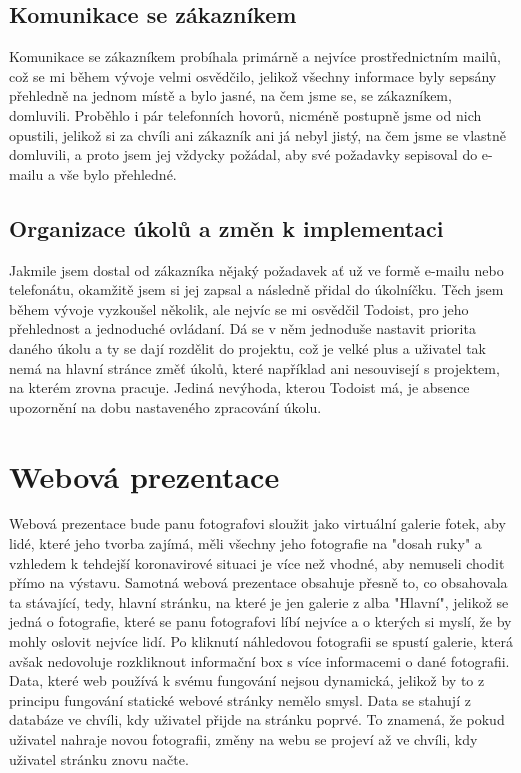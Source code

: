 \documentclass[12pt,a4paper]{report}
\begin{document}
  \section{Komunikace se zákazníkem}
  Komunikace se zákazníkem probíhala primárně a nejvíce prostřednictním mailů,
  což se mi během vývoje velmi osvědčilo, jelikož všechny informace byly sepsány přehledně
  na jednom místě a bylo jasné, na čem jsme se, se zákazníkem, domluvili. Proběhlo i pár telefonních hovorů,
  nicméně postupně jsme od nich opustili, jelikož si za chvíli ani zákazník ani já nebyl jistý, na čem jsme se vlastně domluvili, a proto jsem jej vždycky
  požádal, aby své požadavky sepisoval do e-mailu a vše bylo přehledné.
 
  \section{Organizace úkolů a změn k implementaci}
  Jakmile jsem dostal od zákazníka nějaký požadavek ať už ve formě e-mailu nebo telefonátu, okamžitě jsem si jej 
  zapsal a následně přidal do úkolníčku. Těch jsem během vývoje vyzkoušel několik, ale nejvíc se mi osvědčil 
  Todoist, pro jeho přehlednost a jednoduché ovládaní. Dá se v něm jednoduše nastavit priorita daného úkolu a ty se dají rozdělit
  do projektu, což je velké plus a uživatel tak nemá na hlavní stránce změť úkolů, které například ani nesouvisejí s projektem, na kterém zrovna pracuje.
  Jediná nevýhoda, kterou Todoist má, je absence upozornění na dobu nastaveného zpracování úkolu. 

  \chapter{Webová prezentace}
  Webová prezentace bude panu fotografovi sloužit jako virtuální galerie fotek, aby lidé, které jeho
  tvorba zajímá, měli všechny jeho fotografie na "dosah ruky" a vzhledem k tehdejší koronavirové
  situaci je více než vhodné, aby nemuseli chodit přímo na výstavu.
  Samotná webová prezentace obsahuje přesně to, co obsahovala ta stávající, tedy, hlavní stránku,
  na které je jen galerie z alba "Hlavní", jelikož se jedná o fotografie, které se panu fotografovi líbí
  nejvíce a o kterých si myslí, že by mohly oslovit nejvíce lidí. Po kliknutí náhledovou fotografii se
  spustí galerie, která avšak nedovoluje rozkliknout informační box s více informacemi o dané
  fotografii.
  Data, které web používá k svému fungování nejsou dynamická, jelikož by to z principu fungování
  statické webové stránky nemělo smysl. Data se stahují z databáze ve chvíli, kdy uživatel přijde na
  stránku poprvé. To znamená, že pokud uživatel nahraje novou fotografii, změny na webu se
  projeví až ve chvíli, kdy uživatel stránku znovu načte.
\end{document}
